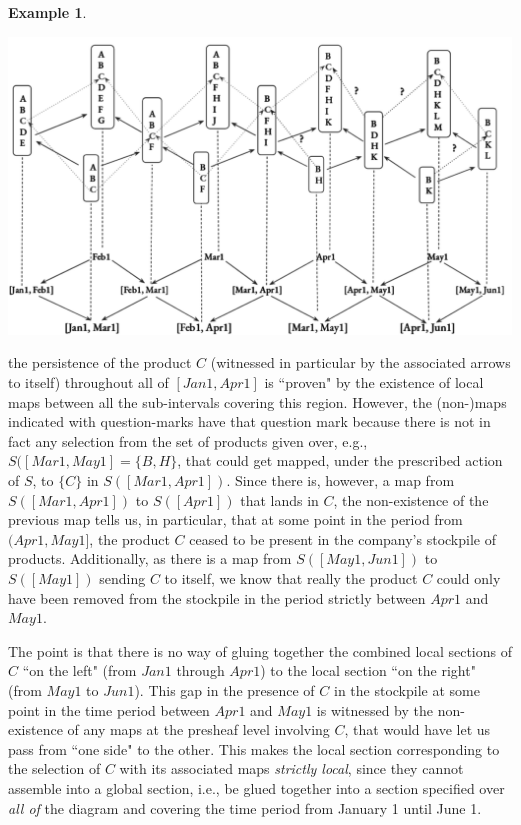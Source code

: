 \documentclass[11pt]{book}
\theoremstyle{definition}
\newtheorem{example}{Example}[section]
\theoremstyle{definition}
\theoremstyle{definition}
\theoremstyle{theorem}
\theoremstyle{definition}
\begin{document}
\begin{example}
	\begin{center}
		\includegraphics*[scale=0.25]{LocalSectionTimeIntervalDiagram.png}
	\end{center}
	the persistence of the product $C$ (witnessed in particular by the associated arrows to itself) throughout all of $[Jan1, Apr1]$ is ``proven" by the existence of local maps between all the sub-intervals covering this region. However, the (non-)maps indicated with question-marks have that question mark because there is not in fact any selection from the set of products given over, e.g., $S([Mar1, May1] = \{B, H\}$, that could get mapped, under the prescribed action of $S$, to $\{C\}$ in $S([Mar1, Apr1])$. Since there is, however, a map from $S([Mar1, Apr1])$ to $S([Apr1])$ that lands in $C$, the non-existence of the previous map tells us, in particular, that at some point in the period from $(Apr1, May1]$, the product $C$ ceased to be present in the company's stockpile of products. Additionally, as there is a map from $S([May1, Jun1])$ to $S([May1])$ sending $C$ to itself, we know that really the product $C$ could only have been removed from the stockpile in the period strictly between $Apr1$ and $May1$. \par 
	The point is that there is no way of gluing together the combined local sections of $C$ ``on the left" (from $Jan1$ through $Apr1$) to the local section ``on the right" (from $May1$ to $Jun1$). This gap in the presence of $C$ in the stockpile at some point in the time period between $Apr1$ and $May1$ is witnessed by the non-existence of any maps at the presheaf level involving $C$, that would have let us pass from ``one side" to the other. This makes the local section corresponding to the selection of $C$ with its associated maps \textit{strictly local}, since they cannot assemble into a global section, i.e., be glued together into a section specified over \textit{all of} the diagram and covering the time period from January 1 until June 1.\par 

\end{example}
\end{document}
